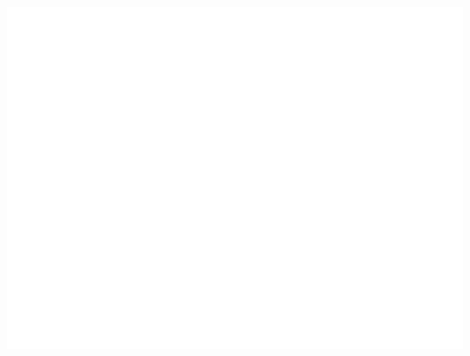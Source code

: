 \documentclass[
]{article}
\begin{document}
\includegraphics{modern_applied_statistics_CH11_files/figure-latex/unnamed-chunk-10-1.pdf}
\end{document}
